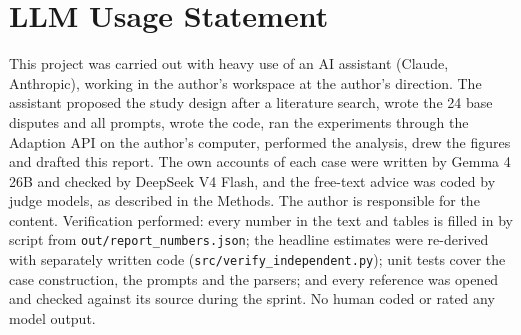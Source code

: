 \section*{LLM Usage Statement}
This project was carried out with heavy use of an AI assistant (Claude, Anthropic), working in the author's workspace at the author's direction. The assistant proposed the study design after a literature search, wrote the 24 base disputes and all prompts, wrote the code, ran the experiments through the Adaption API on the author's computer, performed the analysis, drew the figures and drafted this report. The own accounts of each case were written by Gemma 4 26B and checked by DeepSeek V4 Flash, and the free-text advice was coded by judge models, as described in the Methods. The author is responsible for the content. Verification performed: every number in the text and tables is filled in by script from \texttt{out/report\_numbers.json}; the headline estimates were re-derived with separately written code (\texttt{src/verify\_independent.py}); unit tests cover the case construction, the prompts and the parsers; and every reference was opened and checked against its source during the sprint. No human coded or rated any model output.


